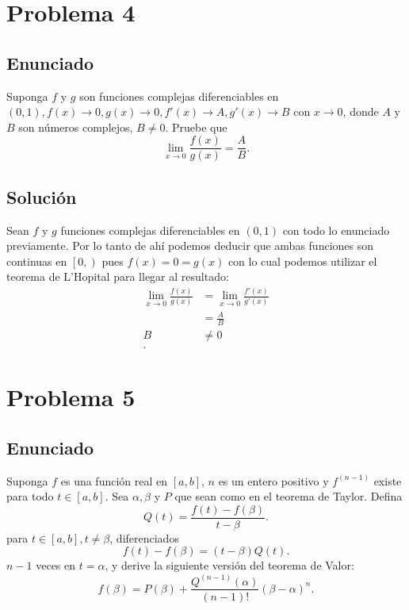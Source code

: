\documentclass{report}
\begin{document}
\chapter{Problema 4}
\section{Enunciado}
Suponga $f$ y $g$ son funciones complejas diferenciables en $\left( 0, 1 \right), f\left( x \right) \to 0, g\left( x \right) \to 0, f'\left( x \right) \to A, g'\left( x \right) \to B $ con $x \to 0$, donde $A$ y $B$ son números complejos, $B \neq 0$. Pruebe que \[
\displaystyle \lim_{x \to 0} \frac{f\left( x \right) }{g\left( x \right) } = \frac{A}{B}
.\]

\section{Solución}

Sean $f$ y $g$ funciones complejas diferenciables en $\left( 0, 1 \right) $ con todo lo enunciado previamente. Por lo tanto de ahí podemos deducir que ambas funciones son continuas en $\left[ 0,  \right) $ pues $f\left( x \right) = 0 = g\left( x \right) $ con lo cual podemos utilizar el teorema de L'Hopital para llegar al resultado:
\begin{align*}
  \lim_{x \to 0} \frac{f\left( x \right) }{g\left( x \right) } &= \lim_{x \to 0}  \frac{f'\left( x \right) }{g'\left( x \right) }\\
  &= \frac{A}{B} \\
  B&\neq  0 \\
.\end{align*}

\chapter{Problema 5}
\section{Enunciado}
Suponga $f$ es una función real en $\left[ a, b \right] $, $n$ es un entero positivo y $f^{\left( n - 1 \right) }$ existe para todo $t \in \left[ a, b \right] $. Sea $\alpha, \beta$ y $P$ que sean como en el teorema de Taylor. Defina \[
Q\left( t \right) = \frac{f\left( t \right) - f\left( \beta \right) }{t - \beta}
.\]  para $t \in \left[ a, b \right] , t \neq \beta$, diferenciados \[
f\left( t \right) - f\left( \beta \right) = \left( t - \beta \right) Q\left( t \right) 
.\] $n - 1$ veces en $t = \alpha$, y derive la siguiente versión del teorema de Valor: \[
f\left( \beta \right) = P\left( \beta \right) + \frac{Q^{\left( n - 1 \right)  }\left( \alpha \right)}{\left( n - 1 \right)! }\left( \beta - \alpha \right)^{n}
.\] 
\end{document}
